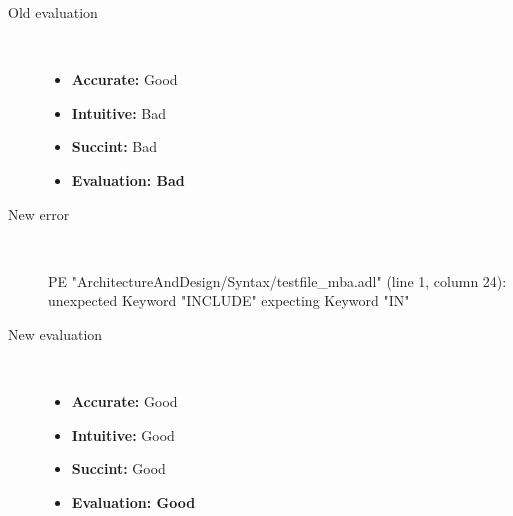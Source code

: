 \begin{description}
\begin{haskell}
\end{haskell}
  \item[Old evaluation]~\\
    \begin{itemize}
    \item \textbf{Accurate:} Good
    \item \textbf{Intuitive:} Bad
    \item \textbf{Succint:} Bad
    \item \textbf{Evaluation: Bad}
    \end{itemize}
  \item[New error]~\\
\begin{haskell}
PE "ArchitectureAndDesign/Syntax/testfile_mba.adl" (line 1, column 24):
unexpected Keyword "INCLUDE"
expecting Keyword "IN"\end{haskell}
  \item[New evaluation]~\\
    \begin{itemize}
    \item \textbf{Accurate:} Good
    \item \textbf{Intuitive:} Good
    \item \textbf{Succint:} Good
    \item \textbf{Evaluation: Good
}
    \end{itemize}
  \end{description}

\hrulefill

